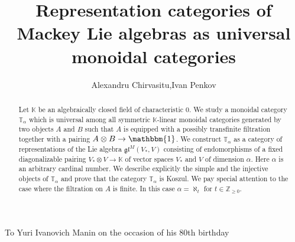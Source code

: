 \documentclass[11pt]{article}
\title{Representation categories of Mackey Lie algebras as universal monoidal categories}
\author{Alexandru Chirvasitu,\quad   Ivan Penkov}
\theoremstyle{plain}
\theoremstyle{nonumberplain}
\theoremstyle{plain}
\theoremstyle{nonumberplain}
\newcommand\bK{\mathbb K}
\newcommand\bT{\mathbb T}
\newcommand\bZ{\mathbb Z}
\newcommand\fgl{\mathfrak{gl}}
\begin{document}

\date{}


\newcommand{\Addresses}{{%
  \bigskip
  \footnotesize

  \textsc{Department of Mathematics, University at Buffalo, Buffalo,
    NY 14260-2900, USA}\par\nopagebreak \textit{E-mail address}:
  \texttt{achirvas@buffalo.edu}

  \medskip

  \textsc{Jacobs University Bremen, Campus Ring 1, 28759 Bremen, Germany}\par\nopagebreak
  \textit{E-mail address}: \texttt{i.penkov@jacobs-university.de}
}}



\maketitle


\begin{flushright}
To Yuri Ivanovich Manin on the occasion of his 80th birthday
\end{flushright}

\begin{abstract}
  Let $\bK$ be an algebraically closed field of characteristic $0$. We study a monoidal category $\bT_\alpha$ which is universal among all symmetric $\bK$-linear monoidal categories generated by two objects $A$ and $B$ such that $A$ is equipped with a possibly transfinite filtration together with a pairing $A\otimes B\to\mathbbm{1}$. We construct $\bT_\alpha$ as a category of representations of the Lie algebra $\fgl^M(V_*,V)$ consisting of endomorphisms of a fixed diagonalizable pairing $V_*\otimes V\to \bK$ of vector spaces $V_*$ and $V$ of dimension $\alpha$.  Here $\alpha$ is an arbitrary cardinal number.  We describe explicitly the simple and the injective objects of $\bT_\alpha$ and prove that the category $\bT_\alpha$ is Koszul.  We pay special attention to the case where the filtration on $A$ is finite. In this case $\alpha=\aleph_t$ for $t\in\bZ_{\geq 0}$.
\end{abstract}


\vspace{.5cm}


\end{document}

